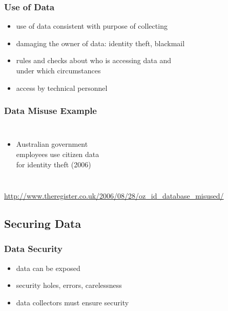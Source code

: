 \documentclass[dvipsnames]{beamer}
\theoremstyle{plain}
\begin{document}
\begin{frame}
  \frametitle{Use of Data}

  \begin{itemize}
    \item use of data consistent with purpose of collecting
    \item damaging the owner of data: identity theft, blackmail

    \medskip
    \item rules and checks about who is accessing data and\\
      under which circumstances
    \item access by technical personnel
  \end{itemize}
\end{frame}

\begin{frame}
  \frametitle{Data Misuse Example}

  \begin{columns}

    \begin{itemize}
      \item Australian government\\
        employees use citizen data\\
        for identity theft (2006)
    \end{itemize}
  \end{columns}

  \medskip
  \tiny{\url{http://www.theregister.co.uk/2006/08/28/oz_id_database_misused/}}\\
\end{frame}

\subsection{Securing Data}

\begin{frame}
  \frametitle{Data Security}

  \begin{itemize}
    \item data can be exposed
    \item security holes, errors, carelessness

    \bigskip
    \item data collectors must ensure security
  \end{itemize}
\end{frame}
\end{document}

